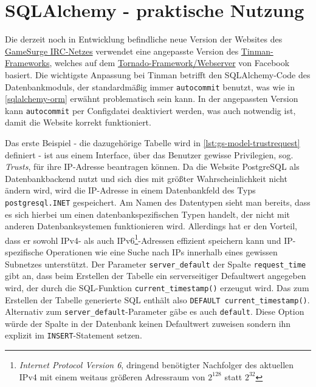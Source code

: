 \chapter{SQLAlchemy - praktische Nutzung}

Die derzeit noch in Entwicklung befindliche neue Version der Websites des
\href{http://www.gamesurge.net}{GameSurge IRC-Netzes} verwendet eine angepasste
Version des \href{https://github.com/gmr/tinman}{Tinman-Frameworks}, welches auf
dem \href{http://www.tornadoweb.org/}{Tornado-Framework/Webserver} von Facebook
basiert. Die wichtigste Anpassung bei Tinman betrifft den SQLAlchemy-Code des
Datenbankmoduls, der standardmäßig immer \texttt{autocommit} benutzt, was wie in
\autoref{sqlalchemy-orm} erwähnt problematisch sein kann. In der angepassten
Version kann \texttt{autocommit} per Configdatei deaktiviert werden, was auch
notwendig ist, damit die Website korrekt funktioniert.

Das erste Beispiel - die dazugehörige Tabelle wird in
\autoref{lst:gs-model-trustrequest} definiert - ist aus einem Interface, über
das Benutzer gewisse Privilegien, sog. \emph{Trusts}, für ihre IP-Adresse
beantragen können. Da die Website PostgreSQL als Datenbankbackend nutzt und sich
dies mit größter Wahrscheinlichkeit nicht ändern wird, wird die IP-Adresse in
einem Datenbankfeld des Typs \texttt{postgresql.INET} gespeichert. Am Namen des
Datentypen sieht man bereits, dass es sich hierbei um einen
datenbankspezifischen Typen handelt, der nicht mit anderen Datenbanksystemen
funktionieren wird. Allerdings hat er den Vorteil, dass er sowohl IPv4- als auch
IPv6\footnote{\emph{Internet Protocol Version 6}, dringend benötigter Nachfolger
des aktuellen IPv4 mit einem weitaus größeren Adressraum von $2^{128}$ statt
$2^{32}$}-Adressen effizient speichern kann und IP-spezifische Operationen wie
eine Suche nach IPs innerhalb eines gewissen Subnetzes unterstützt.
Der Parameter \texttt{server\_default} der Spalte \texttt{request\_time} gibt
an, dass beim Erstellen der Tabelle ein serverseitiger Defaultwert angegeben
wird, der durch die SQL-Funktion \texttt{current\_timestamp()} erzeugut wird.
Das zum Erstellen der Tabelle generierte SQL enthält also \texttt{DEFAULT
current\_timestamp()}. Alternativ zum \texttt{server\_default}-Parameter gäbe es
auch \texttt{default}. Diese Option würde der Spalte in der Datenbank keinen
Defaultwert zuweisen sondern ihn explizit im \texttt{INSERT}-Statement setzen.



